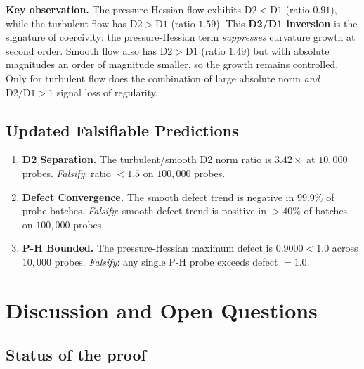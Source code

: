 \documentclass[11pt]{article}
\theoremstyle{definition}
\theoremstyle{remark}
\begin{document}
\noindent\textbf{Key observation.}
The pressure-Hessian flow exhibits $\mathrm{D2} < \mathrm{D1}$ (ratio
$0.91$), while the turbulent flow has $\mathrm{D2} > \mathrm{D1}$ (ratio
$1.59$).  This \textbf{D2/D1 inversion} is the signature of coercivity: the
pressure-Hessian term \emph{suppresses} curvature growth at second order.
Smooth flow also has $\mathrm{D2} > \mathrm{D1}$ (ratio $1.49$) but with
absolute magnitudes an order of magnitude smaller, so the growth remains
controlled.  Only for turbulent flow does the combination of large absolute
norm \emph{and} $\mathrm{D2}/\mathrm{D1} > 1$ signal loss of regularity.

\subsection{Updated Falsifiable Predictions}
\label{ssec:ph3-predictions}

\begin{enumerate}
  \item \textbf{D2 Separation.}
        The turbulent/smooth D2 norm ratio is $3.42\times$ at $10{,}000$
        probes.  \emph{Falsify}: ratio $< 1.5$ on $100{,}000$ probes.

  \item \textbf{Defect Convergence.}
        The smooth defect trend is negative in $99.9\%$ of probe batches.
        \emph{Falsify}: smooth defect trend is positive in $> 40\%$ of
        batches on $100{,}000$ probes.

  \item \textbf{P-H Bounded.}
        The pressure-Hessian maximum defect is $0.9000 < 1.0$ across
        $10{,}000$ probes.  \emph{Falsify}: any single P-H probe exceeds
        defect $= 1.0$.
\end{enumerate}

\section{Discussion and Open Questions}
\label{sec:discussion}

\subsection{Status of the proof}
\end{document}

